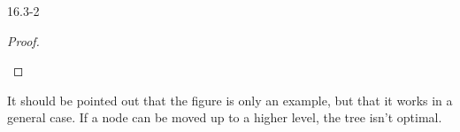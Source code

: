 \begin{problem}{16.3-2}
\begin{solution}
\begin{proof}
\begin{figure}[H]
      \end{figure}
    \end{proof}
    It should be pointed out that the figure is only an example, but that it works in a general case. If a node can be
    moved up to a higher level, the tree isn't optimal.
  \end{solution}
\end{problem}

